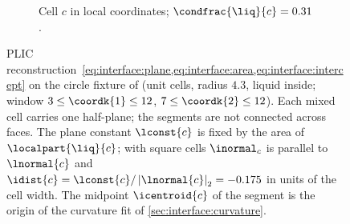 \begin{figure}
\begin{subfigure}[b]{0.39\textwidth}
    \caption{Cell $c$ in local coordinates; $\condfrac{\liq}{c}=\chkPlicC$.}
    \label{fig:interface:plic:cell}
  \end{subfigure}
  \caption{PLIC reconstruction~\cref{eq:interface:plane,eq:interface:area,eq:interface:intercept}
    on the circle fixture of  (unit cells, radius
    $4.3$, liquid inside; window $3\le\coordk{1}\le12$, $7\le\coordk{2}\le12$).
    Each mixed cell carries one half-plane; the segments are not connected
    across faces. The plane constant $\lconst{c}$ is fixed by the area of
    $\localpart{\liq}{c}$; with square cells $\inormal_c$ is parallel to
    $\lnormal{c}$ and $\idist{c}=\lconst{c}/\abs{\lnormal{c}}_2=\chkPlicDistance$ in
    units of the cell width. The midpoint $\icentroid{c}$ of the segment is the
    origin of the curvature fit of \cref{sec:interface:curvature}.}
  \label{fig:interface:plic}
\end{figure}
